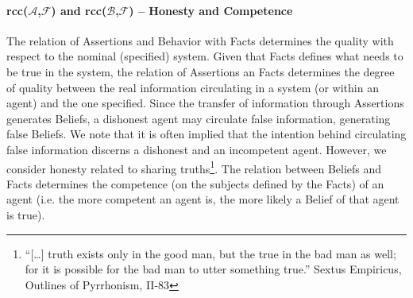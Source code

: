\documentclass[conference]{IEEEtran}
\newcommand{\assertionRegion}{\mathcal{A}}
\newcommand{\beliefRegion}{\mathcal{B}}
\newcommand{\factRegion}{\mathcal{F}}
\newcommand{\Rcc}[2]{rcc(#1,#2)}
\begin{document}
\paragraph{\Rcc{$\assertionRegion$}{$\factRegion$} and
\Rcc{$\beliefRegion$}{$\factRegion$} -- Honesty and Competence} 
The relation of Assertions
and Behavior with Facts determines the quality with respect to the nominal
(specified) system.  Given that Facts defines what needs to be true in the system,
the relation of Assertions an Facts determines the degree of quality between
the real information circulating in a system (or within an agent) and
the one specified.  Since the transfer of information
through Assertions generates Beliefs, a dishonest agent may circulate false
information, generating false Beliefs.  We note that it is often implied that
the intention behind circulating false information discerns a dishonest and an
incompetent agent. However, we consider honesty related to sharing
truths\footnote{``[\ldots] truth exists only in the good man, but the true in
the bad man as well; for it is possible for the bad man to utter something
true.'' Sextus Empiricus, Outlines of Pyrrhonism,
II-83\autocite{Empiricus1990Pyrrhonism}}.  The relation between Beliefs and
Facts determines the competence (on the subjects defined by the Facts) of an
agent (i.e. the more competent an agent is, the more likely a Belief of that
agent is true).
\end{document}

